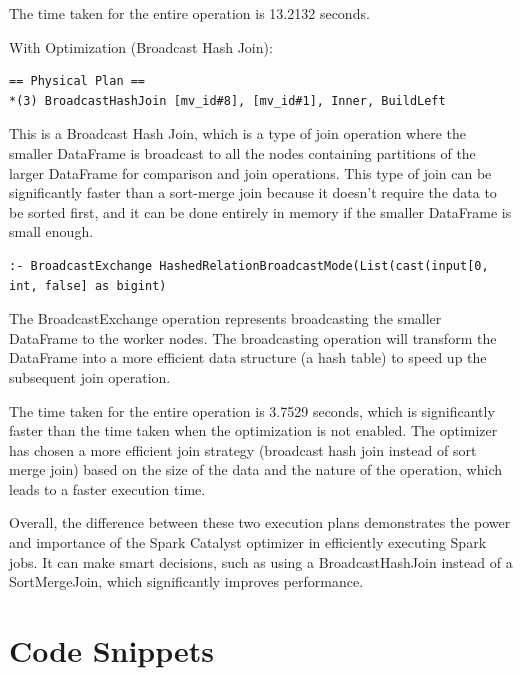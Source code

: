 \documentclass[12pt,twoside]{article}
\begin{document}
The time taken for the entire operation is 13.2132 seconds.

With Optimization (Broadcast Hash Join):

\begin{verbatim}
== Physical Plan ==
*(3) BroadcastHashJoin [mv_id#8], [mv_id#1], Inner, BuildLeft
\end{verbatim}

\noindent This is a Broadcast Hash Join, which is a type of join operation where the smaller DataFrame is broadcast to all the nodes containing partitions of the larger DataFrame for comparison and join operations. This type of join can be significantly faster than a sort-merge join because it doesn't require the data to be sorted first, and it can be done entirely in memory if the smaller DataFrame is small enough.

\begin{verbatim}
:- BroadcastExchange HashedRelationBroadcastMode(List(cast(input[0, int, false] as bigint)
\end{verbatim}

\noindent The BroadcastExchange operation represents broadcasting the smaller DataFrame to the worker nodes. The broadcasting operation will transform the DataFrame into a more efficient data structure (a hash table) to speed up the subsequent join operation.

The time taken for the entire operation is 3.7529 seconds, which is significantly faster than the time taken when the optimization is not enabled. The optimizer has chosen a more efficient join strategy (broadcast hash join instead of sort merge join) based on the size of the data and the nature of the operation, which leads to a faster execution time.

Overall, the difference between these two execution plans demonstrates the power and importance of the Spark Catalyst optimizer in efficiently executing Spark jobs. It can make smart decisions, such as using a BroadcastHashJoin instead of a SortMergeJoin, which significantly improves performance.

\section{Code Snippets}
\begin{code}
\label{code:files}
\inputminted[breaklines, breakafter=d, linenos, frame=single]{python}{./code/csv_to_parquet.py}
\end{code}



\end{document}
